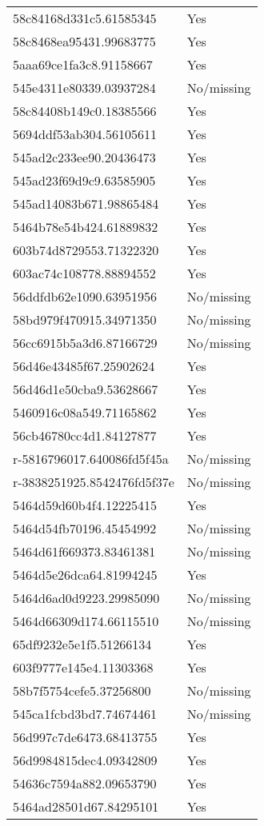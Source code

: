 \begin{tabular}{ll}
58c84168d331c5.61585345 & Yes \\
58c8468ea95431.99683775 & Yes \\
5aaa69ce1fa3c8.91158667 & Yes \\
545e4311e80339.03937284 & No/missing \\
58c84408b149c0.18385566 & Yes \\
5694ddf53ab304.56105611 & Yes \\
545ad2c233ee90.20436473 & Yes \\
545ad23f69d9c9.63585905 & Yes \\
545ad14083b671.98865484 & Yes \\
5464b78e54b424.61889832 & Yes \\
603b74d8729553.71322320 & Yes \\
603ac74c108778.88894552 & Yes \\
56ddfdb62e1090.63951956 & No/missing \\
58bd979f470915.34971350 & No/missing \\
56cc6915b5a3d6.87166729 & No/missing \\
56d46e43485f67.25902624 & Yes \\
56d46d1e50cba9.53628667 & Yes \\
5460916c08a549.71165862 & Yes \\
56cb46780cc4d1.84127877 & Yes \\
r-5816796017.640086fd5f45a & No/missing \\
r-3838251925.8542476fd5f37e & No/missing \\
5464d59d60b4f4.12225415 & Yes \\
5464d54fb70196.45454992 & No/missing \\
5464d61f669373.83461381 & No/missing \\
5464d5e26dca64.81994245 & Yes \\
5464d6ad0d9223.29985090 & No/missing \\
5464d66309d174.66115510 & No/missing \\
65df9232e5e1f5.51266134 & Yes \\
603f9777e145e4.11303368 & Yes \\
58b7f5754cefe5.37256800 & No/missing \\
545ca1fcbd3bd7.74674461 & No/missing \\
56d997c7de6473.68413755 & Yes \\
56d9984815dec4.09342809 & Yes \\
54636c7594a882.09653790 & Yes \\
5464ad28501d67.84295101 & Yes \\

\end{tabular}
